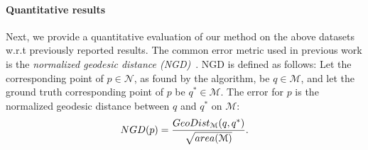 
\paragraph{Quantitative results}
Next, we provide a quantitative evaluation of our method on the above datasets w.r.t previously reported results.
The common error metric used in previous work is the {\em normalized geodesic distance (NGD)}~\cite{kim2011blended}.
NGD is defined as follows:
Let the corresponding point of $p \in \mathcal{N}$, as found by the algorithm, be $q \in \mathcal{M}$, and let the ground truth corresponding point of $p$ be $q^* \in \mathcal{M}$.
The error for $p$ is the normalized geodesic distance between  $q$ and $q^*$ on $\mathcal{M}$:
\begin{equation}
	\centering
	NGD(p)=\frac{GeoDist_{\mathcal{M}}(q,q^*)}{\sqrt{area(\mathcal{M})}}.
\end{equation}
